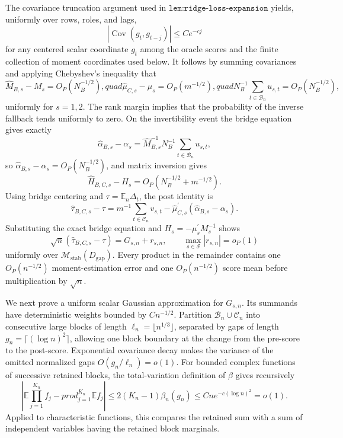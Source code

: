 The covariance truncation argument used in \(\texttt{lem:ridge-loss-expansion}\) yields, uniformly over rows, roles, and lags,
\[
 |\operatorname{Cov}(g_t,g_{t-j})|\leq C e^{-cj}
\]
for any centered scalar coordinate \(g_t\) among the oracle scores and the finite collection of moment coordinates used below.  It follows by summing covariances and applying Chebyshev's inequality that
\[
 \widehat M_{B,s}-M_s=O_P(N_B^{-1/2}),quad
 \widehat\mu_{C,s}-\mu_s=O_P(m^{-1/2}),quad
 N_B^{-1}\sum_{t\in\mathcal B_n}u_{s,t}=O_P(N_B^{-1/2}),
\]
uniformly for \(s=1,2\).  The rank margin implies that the probability of the inverse fallback tends uniformly to zero.  On the invertibility event the bridge equation gives exactly
\[
 \widehat\alpha_{B,s}-\alpha_s
 =\widehat M_{B,s}^{-1}N_B^{-1}\sum_{t\in\mathcal B_n}u_{s,t},
\]
so \(\widehat\alpha_{B,s}-\alpha_s=O_P(N_B^{-1/2})\), and matrix inversion gives
\[
 \widehat H_{B,C,s}-H_s=O_P(N_B^{-1/2}+m^{-1/2}).
\]
Using bridge centering and \(\tau=\mathbb E_n\Delta_t\), the post identity is
\[
 \widehat\tau_{B,C,s}-\tau
 =m^{-1}\sum_{t\in\mathcal C_n}v_{s,t}
 -\widehat\mu_{C,s}^{\prime}(\widehat\alpha_{B,s}-\alpha_s).
\]
Substituting the exact bridge equation and \(H_s=-\mu_s^{\prime}M_s^{-1}\) shows
\[
 \sqrt n(\widehat\tau_{B,C,s}-\tau)=G_{s,n}+r_{s,n},
 \qquad
 \max_{s\in\mathcal S}|r_{s,n}|=o_P(1)
\]
uniformly over \(\mathcal M_{\mathrm{stab}}(D_{\mathrm{gap}})\).  Every product in the remainder contains one \(O_P(n^{-1/2})\) moment-estimation error and one \(O_P(n^{-1/2})\) score mean before multiplication by \(\sqrt n\).

We next prove a uniform scalar Gaussian approximation for \(G_{s,n}\).  Its summands have deterministic weights bounded by \(C n^{-1/2}\).  Partition \(\mathcal B_n\cup\mathcal C_n\) into consecutive large blocks of length \(\ell_n=\lfloor n^{1/3}\rfloor\), separated by gaps of length \(g_n=\lceil(\log n)^2\rceil\), allowing one block boundary at the change from the pre-score to the post-score.  Exponential covariance decay makes the variance of the omitted normalized gaps \(O(g_n/\ell_n)=o(1)\).  For bounded complex functions of successive retained blocks, the total-variation definition of \(\beta\) gives recursively
\[
 \left|\mathbb E\prod_{j=1}^{K_n}f_j-prod_{j=1}^{K_n}\mathbb Ef_j\right|
 \leq2(K_n-1)\beta_n(g_n)
 \leq Cn e^{-c(\log n)^2}=o(1).
\]
Applied to characteristic functions, this compares the retained sum with a sum of independent variables having the retained block marginals.

